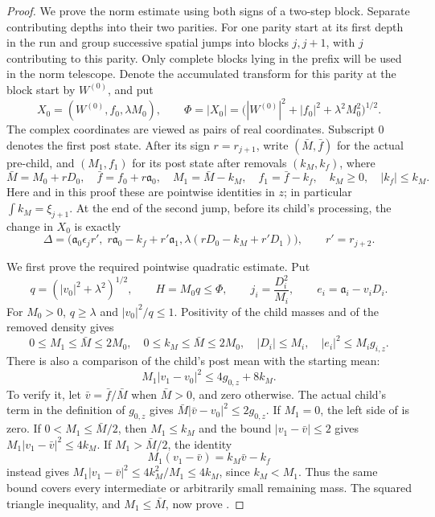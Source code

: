 \begin{proof}
We prove the norm estimate using both signs of a two-step block.  Separate
contributing depths into their two parities.  For one parity start at its
first depth in the run and group successive spatial jumps into blocks
$j,j+1$, with $j$ contributing to this parity.  Only complete blocks lying
in the prefix will be used in the norm telescope.  Denote the accumulated
transform for this parity at the block start by $W^{(0)}$, and put
\[
 X_0=(W^{(0)},f_0,\lambda M_0),\qquad
 \Phi=|X_0|=\big(|W^{(0)}|^2+|f_0|^2+\lambda^2M_0^2\big)^{1/2}.
\]
The complex coordinates are viewed as pairs of real coordinates.  Subscript
$0$ denotes the first post state.  After its sign $r=r_{j+1}$, write
$(\bar M,\bar f)$ for the actual pre-child, and $(M_1,f_1)$ for its post
state after removals $(k_M,k_f)$, where
\[
 \bar M=M_0+rD_0,\quad \bar f=f_0+r\mathfrak a_0,\quad
 M_1=\bar M-k_M,\quad f_1=\bar f-k_f,
 \quad k_M\ge0,\quad |k_f|\le k_M.
\]
Here and in this proof these are pointwise identities in $z$; in particular
$\int k_M=\xi_{j+1}$.  At the end of the second jump, before its child's
processing, the change in $X_0$ is exactly
\begin{equation}
 \Delta=\big(\mathfrak a_0\epsilon_jr',\;r\mathfrak a_0-k_f+r'\mathfrak a_1,
                    \lambda(rD_0-k_M+r'D_1)\big),\qquad r'=r_{j+2}.
 \label{eq:paths-two-step-increment}
\end{equation}

We first prove the required pointwise quadratic estimate.  Put
\[
 q=(|v_0|^2+\lambda^2)^{1/2},\qquad H=M_0q\le\Phi,
 \qquad j_i=\frac{D_i^2}{M_i},\qquad e_i=\mathfrak a_i-v_iD_i.
\]
For $M_0>0$, $q\ge\lambda$ and $|v_0|^2/q\le1$.  Positivity of the child
masses and of the removed density gives
\begin{equation}
 0\le M_1\le\bar M\le2M_0,
 \quad 0\le k_M\le\bar M\le2M_0,
 \quad |D_i|\le M_i,
 \quad |e_i|^2\le M_i g_{i,z}.
 \label{eq:paths-positive-domination}
\end{equation}
There is also a comparison of the child's post mean with the starting
mean:
\begin{equation}
                 M_1|v_1-v_0|^2\le4g_{0,z}+8k_M.
 \label{eq:paths-child-mean}
\end{equation}
To verify it, let $\bar v=\bar f/\bar M$ when $\bar M>0$, and zero otherwise.
The actual
child's term in the definition of $g_{0,z}$ gives
$\bar M|\bar v-v_0|^2\le2g_{0,z}$.  If $M_1=0$, the left side of
 is zero.  If $0<M_1\le\bar M/2$, then
$M_1\le k_M$ and the bound $|v_1-\bar v|\le2$ gives
$M_1|v_1-\bar v|^2\le4k_M$.  If $M_1>\bar M/2$, the identity
\[
 M_1(v_1-\bar v)=k_M\bar v-k_f
\]
instead gives $M_1|v_1-\bar v|^2\le4k_M^2/M_1\le4k_M$, since $k_M<M_1$.
Thus the same bound covers every intermediate or arbitrarily small
remaining mass.  The squared triangle inequality, and $M_1\le\bar M$,
now prove .


\end{proof}
